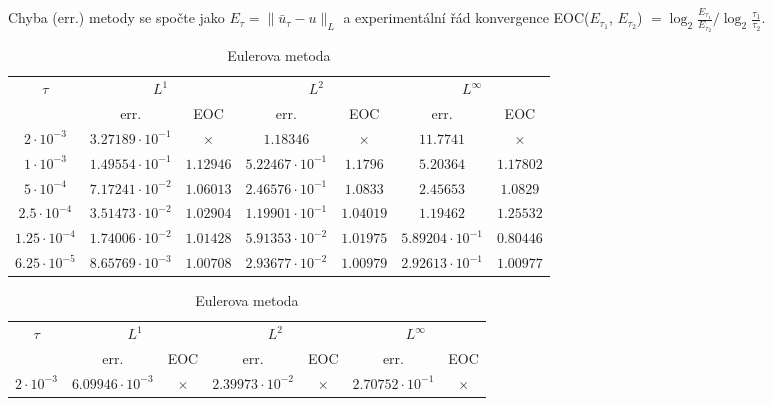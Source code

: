 \documentclass[11pt,american,czech]{article}
\begin{document}
\noindent
Chyba (err.) metody se spočte jako $E_{\tau} = \rVert\bar{u}_{\tau}-u\lVert_{L}$ a experimentální řád konvergence EOC($E_{\tau_{1}}$, $E_{\tau_{2}}$) $= {\log_{2}{\tfrac{E_{\tau_{1}}}{E_{\tau_{2}}}}}\big/{\log_{2}{\tfrac{\tau_{1}}{\tau_{2}}}}$.
\begin{table}[!htb]
	\centering\shorthandoff{-}
	\renewcommand{\arraystretch}{1.2}
	\begin{tabular}{ |c||c|c|c|c|c|c| }
	  \hline

	\multirow{2}{*}{$\tau$} & \multicolumn{2}{c|}{$L^{1}$} & \multicolumn{2}{c|}{$L^{2}$} & \multicolumn{2}{c|}{$L^{\infty}$} \\ \hhline{~------}
	& err. &  EOC & err. & EOC & err. & EOC \\
	  \hline \hline
	$2\cdot10^{-3}$ & $3.27189\cdot10^{-1}$ & $\times$ & $1.18346$ & $\times$ & $11.7741$ & $\times$  \\ \hline 
	$1\cdot10^{-3}$ & $1.49554\cdot10^{-1}$ & $1.12946$ & $5.22467\cdot10^{-1}$ & $1.1796$ & $5.20364$ & $1.17802$ \\ \hline
	$5\cdot10^{-4}$ & $7.17241\cdot10^{-2}$ & $1.06013$ & $2.46576\cdot10^{-1}$ & $1.0833$ & $2.45653$ & $1.0829$  \\ \hline
	$2.5\cdot10^{-4}$ & $3.51473\cdot10^{-2}$ & $1.02904$ & $1.19901\cdot10^{-1}$ & $1.04019$ & $1.19462$ & $1.25532$  \\ \hline
	$1.25\cdot10^{-4}$ & $1.74006\cdot10^{-2}$ & $1.01428$ & $5.91353\cdot10^{-2}$ & $1.01975$ & $5.89204\cdot10^{-1}$ & $0.80446$  \\ \hline
	$6.25\cdot10^{-5}$ & $8.65769\cdot10^{-3}$ & $1.00708$ & $2.93677\cdot10^{-2}$ & $1.00979$ & $2.92613\cdot10^{-1}$ & $1.00977$  \\ \hline
	\end{tabular}
	\caption{Eulerova metoda}
	\vspace{0.75cm}
	\begin{tabular}{ |c||c|c|c|c|c|c| }
	  \hline
	\multirow{2}{*}{$\tau$} & \multicolumn{2}{c|}{$L^{1}$} & \multicolumn{2}{c|}{$L^{2}$} & \multicolumn{2}{c|}{$L^{\infty}$} \\ \hhline{~------}
	& err. &  EOC & err. & EOC & err. & EOC \\
	  \hline \hline
	$2\cdot10^{-3}$ & $6.09946\cdot10^{-3}$ & $\times$ & $2.39973\cdot10^{-2}$ & $\times$ & $2.70752\cdot10^{-1}$ & $\times$  \\ \hline 

\end{tabular}
\end{table}
\end{document}
